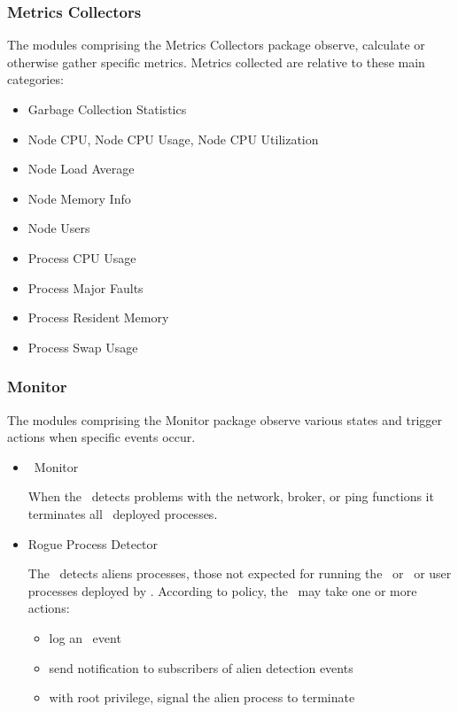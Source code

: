 \begin{itemize}
\begin{itemize}
    \end{itemize}  
    
    \subsubsection{Metrics Collectors} 
    
    The modules comprising the Metrics Collectors package observe, calculate
    or otherwise gather specific metrics. Metrics collected are relative to
    these main categories:
        
    \begin{itemize}
      \item Garbage Collection Statistics
      \item Node CPU, Node CPU Usage, Node CPU Utilization
      \item Node Load Average
      \item Node Memory Info
      \item Node Users
      \item Process CPU Usage
      \item Process Major Faults
      \item Process Resident Memory
      \item Process Swap Usage
    \end{itemize}  
    
    \subsubsection{Monitor} 

    The modules comprising the Monitor package observe various states and
    trigger actions when specific events occur.
        
    \begin{itemize}
      \item \varAgent~Monitor
      
      When the \varAgent~detects problems with the network, broker, or ping
      functions it terminates all \varAgent~deployed processes.
       
      \item Rogue Process Detector
      
      The \varAgent~detects aliens processes, those not expected for running
      the \varOS~or \varDUCC~or user processes deployed by \varDUCC.
      According to policy, the \varAgent~may take one or more actions:
      \begin{itemize}
        \item log an \varAlienDetected~event
        \item send notification to subscribers of alien detection events
        \item with root privilege, signal the alien process to terminate
      \end{itemize} 
      

\end{itemize}
\end{itemize}
